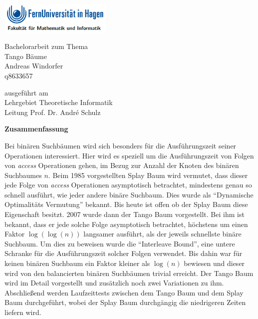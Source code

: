 \documentclass[a4paper,12pt]{article}
\begin{document}
\begin{center}
\includegraphics[width= 0.4\textwidth]{"Medien/kleinkram/UniLogo"}
\end{center}
\bigskip


 \begin{center}
 	\LARGE{Bachelorarbeit zum Thema\\
 	Tango Bäume}\\
 \bigskip
 \bigskip
 \bigskip
 \bigskip
\bigskip
\bigskip 
\bigskip
\bigskip
 \large{
 Andreas Windorfer\\
 q8633657}
 \end{center}
 \bigskip
 \bigskip
 \bigskip
 \bigskip 
 \bigskip
 \bigskip
 \bigskip 
  \bigskip 
 \bigskip
 \bigskip
 \bigskip 
  \begin{center}
 ausgeführt am\\
 Lehrgebiet Theoretische Informatik\\
 Leitung Prof. Dr. André Schulz\\
\end{center}

\author{Andreas Windorfer}





\newpage
\begin{center}
\textbf{Zusammenfassung}
\end{center}
 Bei binären Suchbäumen wird sich besonders für die Ausführungszeit seiner Operationen  interessiert. Hier wird es speziell um die Ausführungszeit von Folgen von \textit{access} Operationen gehen, im Bezug zur Anzahl der Knoten des binären Suchbaumes $n$. Beim 1985  vorgestellten Splay Baum \cite{splay} wird vermutet, dass dieser jede Folge von  \textit{access} Operationen asymptotisch betrachtet, mindestens genau so schnell ausführt, wie jeder andere binäre Suchbaum. Dies wurde als \enquote{Dynamische Optimalitäts Vermutung} bekannt. Bis heute ist offen ob der Splay Baum diese Eigenschaft besitzt.  2007 wurde dann der Tango Baum  \cite{demainDinamicOpti} vorgestellt. Bei ihm ist bekannt, dass er jede solche Folge asymptotisch betrachtet, höchstens um einen Faktor $\log\left(\log\left(n\right)\right)$ langsamer ausführt, als der jeweils schnellste binäre Suchbaum. Um dies zu beweisen wurde die \enquote{Interleave Bound}, eine untere Schranke für die Ausführungszeit solcher Folgen verwendet.  Bis dahin war für keinen binären Suchbaum ein Faktor kleiner als $\log\left(n\right)$ bewiesen und dieser wird von den balancierten binären Suchbäumen trivial erreicht. Der Tango Baum wird im Detail vorgestellt und zusätzlich noch zwei Variationen zu ihm. Abschließend werden Laufzeittests zwischen dem Tango Baum und dem Splay Baum durchgeführt, wobei der Splay Baum durchgängig die niedrigeren Zeiten liefern wird. 
\newpage
\tableofcontents
\newpage
\end{document}
